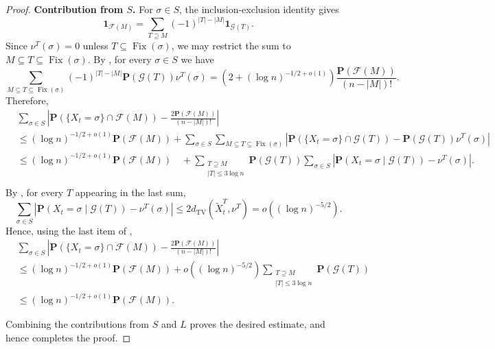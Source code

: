 \begin{proof}
    \medskip
    \noindent
    \textbf{Contribution from $S$.}
    For $\sigma\in S$, the inclusion-exclusion identity gives
    $$
        \mathbf 1_{\mathcal F(M)}
        =
        \sum_{T\supseteq M}
        (-1)^{|T|-|M|}\mathbf 1_{\mathcal G(T)}.
    $$
    Since $\nu^T(\sigma)=0$ unless $T\subseteq \operatorname{Fix}(\sigma)$, we may restrict
    the sum to $M\subseteq T\subseteq \operatorname{Fix}(\sigma)$. By ,
    for every $\sigma\in S$ we have
    $$
        \sum_{M\subseteq T\subseteq \operatorname{Fix}(\sigma)}
        (-1)^{|T|-|M|}
        \mathbf P(\mathcal G(T))\nu^T(\sigma)
        =
        \left(2+(\log n)^{-1/2+o(1)}\right)
        \frac{\mathbf P(\mathcal F(M))}{(n-|M|)!}.
    $$
    Therefore,
    \begin{align*}
        &\sum_{\sigma\in S}
        \left|
        \mathbf P(\{X_t=\sigma\}\cap \mathcal F(M))
        -
        \frac{2\mathbf P(\mathcal F(M))}{(n-|M|)!}
        \right| \\
        &\leq
        (\log n)^{-1/2+o(1)}\mathbf P(\mathcal F(M))+
        \sum_{\sigma\in S}
        \sum_{M\subseteq T\subseteq \operatorname{Fix}(\sigma)}
        \left|
        \mathbf P(\{X_t=\sigma\}\cap \mathcal G(T))
        -
        \mathbf P(\mathcal G(T))\nu^T(\sigma)
        \right| \\
        &\leq
        (\log n)^{-1/2+o(1)}\mathbf P(\mathcal F(M))\quad+
        \sum_{\substack{T\supseteq M\\ |T|\leq 3\log n}}
        \mathbf P(\mathcal G(T))
        \sum_{\sigma\in S}
        \left|
        \mathbf P(X_t=\sigma\mid \mathcal G(T))
        -
        \nu^T(\sigma)
        \right|. \\
    \end{align*}
    By , for every $T$ appearing in the last sum,
    $$
        \sum_{\sigma\in S}
        \left|
        \mathbf P(X_t=\sigma\mid \mathcal G(T))
        -
        \nu^T(\sigma)
        \right|
        \leq
        2d_{\mathrm{TV}}(\widetilde X_t^T,\nu^T)
        =
        o\left((\log n)^{-5/2}\right).
    $$
    Hence, using the last item of ,
    \begin{align*}
        &\sum_{\sigma\in S}
        \left|
        \mathbf P(\{X_t=\sigma\}\cap \mathcal F(M))
        -
        \frac{2\mathbf P(\mathcal F(M))}{(n-|M|)!}
        \right| \\
        &\leq
        (\log n)^{-1/2+o(1)}\mathbf P(\mathcal F(M))
        +
        o\left((\log n)^{-5/2}\right)
        \sum_{\substack{T\supseteq M\\ |T|\leq 3\log n}}
        \mathbf P(\mathcal G(T)) \\
        &\leq
        (\log n)^{-1/2+o(1)}\mathbf P(\mathcal F(M)).
    \end{align*}

    Combining the contributions from $S$ and $L$ proves the desired estimate, and hence
    completes the proof.
\end{proof}

